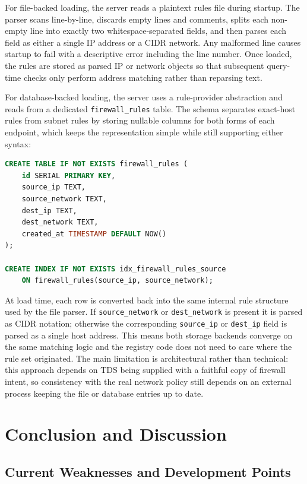\documentclass[10pt,a4paper]{article}
\begin{document}
For file-backed loading, the server reads a plaintext rules file during startup. The parser scans line-by-line, discards empty lines and comments, splits each non-empty line into exactly two whitespace-separated fields, and then parses each field as either a single IP address or a CIDR network. Any malformed line causes startup to fail with a descriptive error including the line number. Once loaded, the rules are stored as parsed IP or network objects so that subsequent query-time checks only perform address matching rather than reparsing text.

For database-backed loading, the server uses a rule-provider abstraction and reads from a dedicated \texttt{firewall\_rules} table. The schema separates exact-host rules from subnet rules by storing nullable columns for both forms of each endpoint, which keeps the representation simple while still supporting either syntax:

\begin{lstlisting}[language=SQL]
CREATE TABLE IF NOT EXISTS firewall_rules (
    id SERIAL PRIMARY KEY,
    source_ip TEXT,
    source_network TEXT,
    dest_ip TEXT,
    dest_network TEXT,
    created_at TIMESTAMP DEFAULT NOW()
);

CREATE INDEX IF NOT EXISTS idx_firewall_rules_source
    ON firewall_rules(source_ip, source_network);
\end{lstlisting}

At load time, each row is converted back into the same internal rule structure used by the file parser. If \texttt{source\_network} or \texttt{dest\_network} is present it is parsed as CIDR notation; otherwise the corresponding \texttt{source\_ip} or \texttt{dest\_ip} field is parsed as a single host address. This means both storage backends converge on the same matching logic and the registry code does not need to care where the rule set originated. The main limitation is architectural rather than technical: this approach depends on TDS being supplied with a faithful copy of firewall intent, so consistency with the real network policy still depends on an external process keeping the file or database entries up to date.

\section{Conclusion and Discussion}

\subsection{Current Weaknesses and Development Points}
\end{document}
